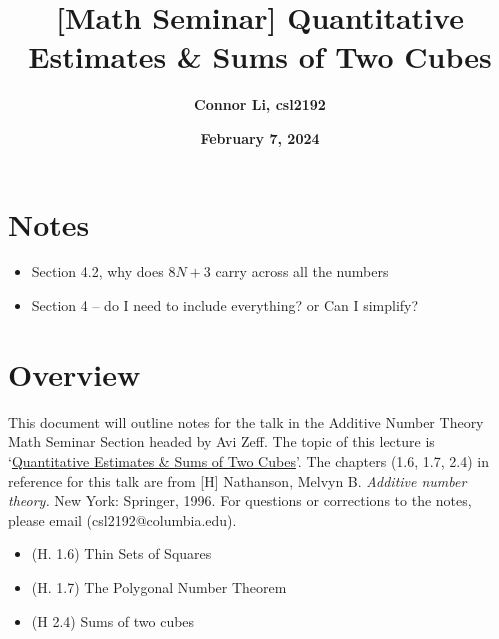 \documentclass[8pt]{extarticle}
\title{\textbf{[Math Seminar] Quantitative Estimates \& Sums of Two Cubes}}
\author{\textbf{Connor Li, csl2192}}
\date{\textbf{February 7, 2024}}
\begin{document}
\maketitle

\tableofcontents


\section*{Notes}
\begin{itemize}
    \item Section 4.2, why does $8N+3$ carry across all the numbers
    \item Section 4 -- do I need to include everything? or Can I simplify?
\end{itemize}

\pagebreak
\section{Overview}
This document will outline notes for the talk in the Additive Number Theory Math Seminar Section headed by Avi Zeff. The topic of this lecture is `\underline{Quantitative Estimates \& Sums of Two Cubes}'. The chapters (1.6, 1.7, 2.4) in reference for this talk are from [H] Nathanson, Melvyn B. \textit{Additive number theory.} New York: Springer, 1996. For questions or corrections to the notes, please email (csl2192@columbia.edu).
\begin{itemize}
    \item (H. 1.6) Thin Sets of Squares
    \item (H. 1.7) The Polygonal Number Theorem
    \item (H 2.4) Sums of two cubes
\end{itemize}
\end{document}

